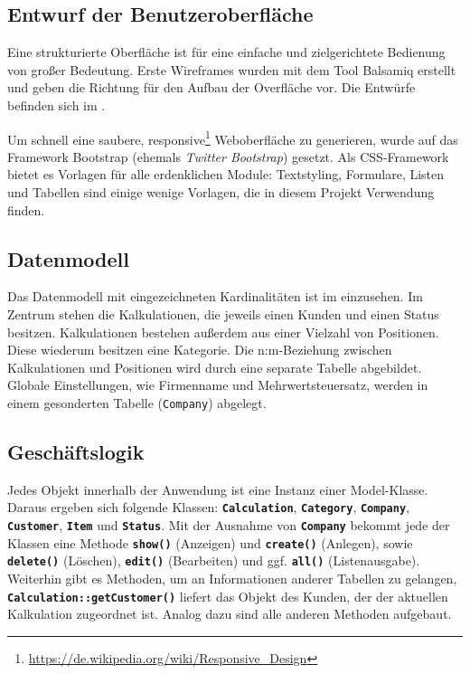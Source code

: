 \subsection{Entwurf der Benutzeroberfläche}
\label{sec:Benutzeroberflaeche}
Eine strukturierte Oberfläche ist für eine einfache und zielgerichtete Bedienung
von großer Bedeutung. Erste Wireframes wurden mit dem Tool
Balsamiq \citet{Balsamiq} erstellt und geben die Richtung für den Aufbau der
Overfläche vor. Die Entwürfe befinden sich im .

Um schnell eine saubere,
responsive\footnote{\url{https://de.wikipedia.org/wiki/Responsive_Design}}
Weboberfläche zu generieren, wurde auf das Framework Bootstrap \citet{Bootstrap}
(ehemals \textit{Twitter Bootstrap}) gesetzt. Als \acs{CSS}-Framework bietet es
Vorlagen für alle erdenklichen Module: Textstyling, Formulare, Listen und Tabellen sind
einige wenige Vorlagen, die in diesem Projekt Verwendung finden.


\subsection{Datenmodell}
\label{sec:Datenmodell}
Das Datenmodell mit eingezeichneten Kardinalitäten ist im
 einzusehen. Im Zentrum stehen die Kalkulationen,
die jeweils einen Kunden und einen Status besitzen. Kalkulationen bestehen
außerdem aus einer Vielzahl von Positionen. Diese wiederum besitzen eine
Kategorie. Die n:m-Beziehung zwischen Kalkulationen und Positionen wird
durch eine separate Tabelle abgebildet. Globale Einstellungen, wie
Firmenname und Mehrwertsteuersatz, werden in einem gesonderten Tabelle
(\texttt{Company}) abgelegt.

\subsection{Geschäftslogik}
\label{sec:Geschaeftslogik}
Jedes Objekt innerhalb der Anwendung ist eine Instanz einer Model-Klasse. Daraus
ergeben sich folgende Klassen: \textbf{\texttt{Calculation}},
\textbf{\texttt{Category}}, \textbf{\texttt{Company}},
\textbf{\texttt{Customer}}, \textbf{\texttt{Item}} und \textbf{\texttt{Status}}.
Mit der Ausnahme von \textbf{\texttt{Company}} bekommt jede der Klassen eine
Methode \textbf{\texttt{show()}} (Anzeigen) und \textbf{\texttt{create()}}
(Anlegen), sowie \textbf{\texttt{delete()}} (Löschen), \textbf{\texttt{edit()}}
(Bearbeiten) und ggf. \textbf{\texttt{all()}} (Listenausgabe).
Weiterhin gibt es Methoden, um an Informationen anderer Tabellen zu gelangen,
\textbf{\texttt{Calculation::\-getCustomer()}} \zB liefert das Objekt des
Kunden, der der aktuellen Kalkulation zugeordnet ist. Analog dazu sind alle
anderen Methoden aufgebaut.

